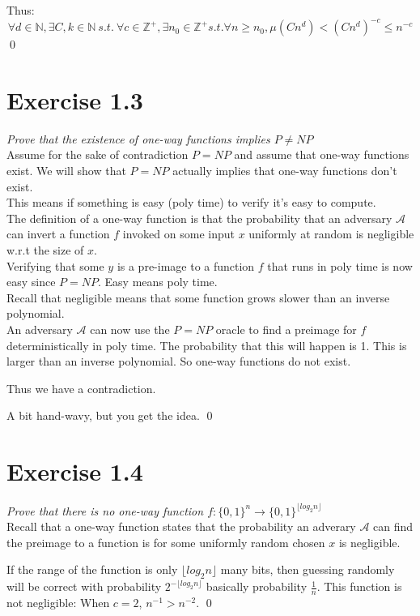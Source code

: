 \documentclass[11pt]{article}
\begin{document}
Thus:
$$
\forall d \in \mathbb{N}, \exists C,k \in \mathbb{N}\ s.t.\  \forall c \in \mathbb{Z}^{+}, \exists n_0 \in \mathbb{Z}^{+} s.t. \forall n \geq n_0, \mu(Cn^d) < (Cn^d)^{-c} \leq n^{-c}
$$ \qed

\section*{Exercise 1.3}

\textit{Prove that the existence of one-way functions implies $P \neq NP$} \\

Assume for the sake of contradiction $P = NP$ and assume that one-way functions exist. We will show that $P = NP$ actually implies that one-way functions don't exist. \\

This means if something is easy (poly time) to verify it's easy to compute. \\

The definition of a one-way function is that the probability that an adversary $\mathcal{A}$ can invert a function $f$ invoked on some input $x$ uniformly at random is negligible w.r.t the size of $x$. \\

Verifying that some $y$ is a pre-image to a function $f$ that runs in poly time is now easy since $P = NP$. Easy means poly time. \\

Recall that negligible means that some function grows slower than an inverse polynomial. \\

An adversary $\mathcal{A}$ can now use the $P = NP$ oracle to find a preimage for $f$ deterministically in poly time. The probability that this will happen is 1. This is larger than an inverse polynomial. So one-way functions do not exist.

Thus we have a contradiction.

A bit hand-wavy, but you get the idea. \qed

\section*{Exercise 1.4}

\textit{Prove that there is no one-way function $f : \{0,1\}^n \rightarrow \{0,1\}^{\lfloor log_2n \rfloor}$} \\

Recall that a one-way function states that the probability an adverary $\mathcal{A}$ can find the preimage to a function is for some uniformly random chosen $x$ is negligible.

If the range of the function is only $\lfloor log_2n \rfloor$ many bits, then guessing randomly will be correct with probability $2^{-\lfloor log_2n \rfloor}$ basically probability $\frac{1}{n}$. This function is not negligible: When $c = 2$, $n^{-1} > n^{-2}$. \qed
\end{document}
